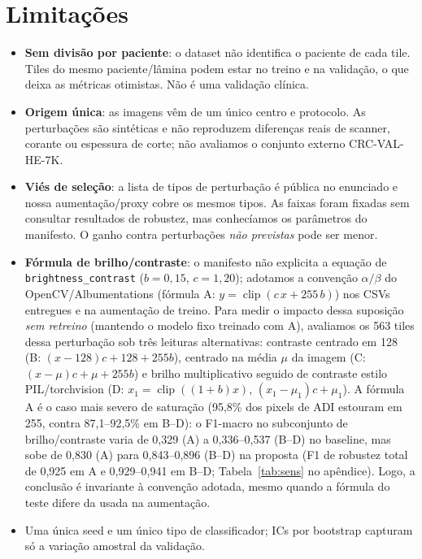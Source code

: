 \documentclass[10pt,conference]{IEEEtran}
\newcommand{\cfg}[1]{\texttt{#1}}
\begin{document}
\section{Limitações}
\begin{itemize}
\item \textbf{Sem divisão por paciente}: o dataset não identifica o paciente de cada tile. Tiles do mesmo paciente/lâmina podem estar no treino e na validação, o que deixa as métricas otimistas. Não é uma validação clínica.
\item \textbf{Origem única}: as imagens vêm de um único centro e protocolo. As perturbações são sintéticas e não reproduzem diferenças reais de scanner, corante ou espessura de corte; não avaliamos o conjunto externo CRC-VAL-HE-7K.
\item \textbf{Viés de seleção}: a lista de tipos de perturbação é pública no enunciado e nossa aumentação/proxy cobre os mesmos tipos. As faixas foram fixadas sem consultar resultados de robustez, mas conhecíamos os parâmetros do manifesto. O ganho contra perturbações \emph{não previstas} pode ser menor.
\item \textbf{Fórmula de brilho/contraste}: o manifesto não explicita a equação de \cfg{brightness\_contrast} ($b{=}0{,}15$, $c{=}1{,}20$); adotamos a convenção $\alpha/\beta$ do OpenCV/Albumentations (fórmula A: $y=\operatorname{clip}(c\,x+255\,b)$) nos CSVs entregues e na aumentação de treino. Para medir o impacto dessa suposição \emph{sem retreino} (mantendo o modelo fixo treinado com A), avaliamos os 563 tiles dessa perturbação sob três leituras alternativas: contraste centrado em 128 (B: $(x{-}128)c+128+255b$), centrado na média $\mu$ da imagem (C: $(x{-}\mu)c+\mu+255b$) e brilho multiplicativo seguido de contraste estilo PIL/torchvision (D: $x_1=\operatorname{clip}((1{+}b)x)$, $(x_1{-}\mu_1)c+\mu_1$). A fórmula A é o caso mais severo de saturação (95,8\% dos pixels de ADI estouram em 255, contra 87,1--92,5\% em B--D): o F1-macro no subconjunto de brilho/contraste varia de 0,329 (A) a 0,336--0,537 (B--D) no baseline, mas sobe de 0,830 (A) para 0,843--0,896 (B--D) na proposta (F1 de robustez total de 0,925 em A e 0,929--0,941 em B--D; Tabela~\ref{tab:sens} no apêndice). Logo, a conclusão é invariante à convenção adotada, mesmo quando a fórmula do teste difere da usada na aumentação.
\item Uma única seed e um único tipo de classificador; ICs por bootstrap capturam só a variação amostral da validação.
\end{itemize}
\end{document}
